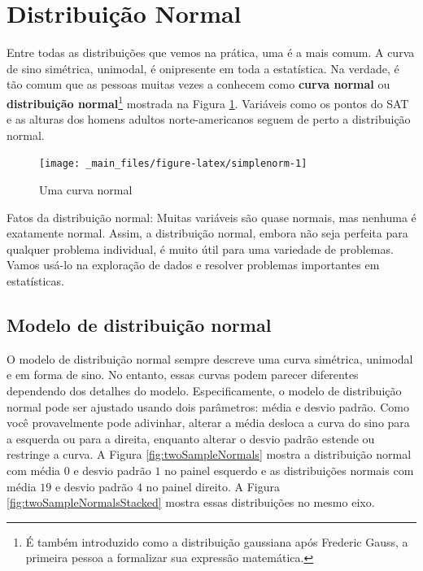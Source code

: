 \documentclass[
]{book}
\theoremstyle{definition}
\theoremstyle{definition}
\theoremstyle{definition}
\theoremstyle{definition}
\theoremstyle{remark}
\begin{document}
\hypertarget{normalDist}{%
\section{Distribuição Normal}\label{normalDist}}

Entre todas as distribuições que vemos na prática, uma é a mais comum. A curva de sino simétrica, unimodal, é onipresente em toda a estatística. Na verdade, é tão comum que as pessoas muitas vezes a conhecem como \textbf{curva normal} ou \textbf{distribuição normal}\footnote{É também introduzido como a distribuição gaussiana após Frederic Gauss, a primeira pessoa a formalizar sua expressão matemática.} mostrada na Figura \ref{fig:simplenorm}. Variáveis como os pontos do SAT e as alturas dos homens adultos norte-americanos seguem de perto a distribuição normal.

\begin{figure}
\texttt{[image: \_main\_files/figure-latex/simplenorm-1]} \caption{Uma curva normal}\label{fig:simplenorm}
\end{figure}

Fatos da distribuição normal: Muitas variáveis são quase normais, mas nenhuma é exatamente normal. Assim, a distribuição normal, embora não seja perfeita para qualquer problema individual, é muito útil para uma variedade de problemas. Vamos usá-lo na exploração de dados e resolver problemas importantes em estatísticas.

\hypertarget{normalDistributionModel}{%
\subsection{Modelo de distribuição normal}\label{normalDistributionModel}}

O modelo de distribuição normal sempre descreve uma curva simétrica, unimodal e em forma de sino. No entanto, essas curvas podem parecer diferentes dependendo dos detalhes do modelo. Especificamente, o modelo de distribuição normal pode ser ajustado usando dois parâmetros: média e desvio padrão. Como você provavelmente pode adivinhar, alterar a média desloca a curva do sino para a esquerda ou para a direita, enquanto alterar o desvio padrão estende ou restringe a curva. A Figura \ref{fig:twoSampleNormals} mostra a distribuição normal com média \(0\) e desvio padrão \(1\) no painel esquerdo e as distribuições normais com média \(19\) e desvio padrão \(4\) no painel direito. A Figura \ref{fig:twoSampleNormalsStacked} mostra essas distribuições no mesmo eixo.
\end{document}
